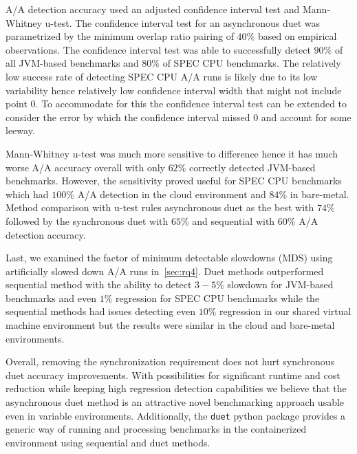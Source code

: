 A/A detection accuracy used an adjusted confidence interval test and \mbox{Mann-Whitney} \mbox{u-test}.
The confidence interval test for an asynchronous duet was parametrized by the minimum overlap ratio pairing of $40\%$ based on empirical observations.
The confidence interval test was able to successfully detect $90\%$ of all \mbox{JVM-based} benchmarks and $80\%$ of SPEC CPU benchmarks.
The relatively low success rate of detecting SPEC CPU A/A runs is likely due to its low variability hence relatively low confidence interval width that might not include point $0$.
To accommodate for this the confidence interval test can be extended to consider the error by which the confidence interval missed $0$ and account for some leeway.

\mbox{Mann-Whitney} \mbox{u-test} was much more sensitive to difference hence it has much worse A/A accuracy overall with only $62\%$ correctly detected \mbox{JVM-based} benchmarks.
However, the sensitivity proved useful for SPEC CPU benchmarks which had $100\%$ A/A detection in the cloud environment and $84\%$ in \mbox{bare-metal}.
Method comparison with \mbox{u-test} rules asynchronous duet as the best with $74\%$ followed by the synchronous duet with $65\%$ and sequential with $60\%$ A/A detection accuracy.

Last, we examined the factor of minimum detectable slowdowns (MDS) using artificially slowed down A/A runs in~\cref{sec:rq4}.
Duet methods outperformed sequential method with the ability to detect $3-5\%$ slowdown for \mbox{JVM-based} benchmarks and even $1\%$ regression for SPEC CPU benchmarks while the sequential methods had issues detecting even $10\%$ regression in our shared virtual machine environment but the results were similar in the cloud and bare-metal environments.

Overall, removing the synchronization requirement does not hurt synchronous duet accuracy improvements.
With possibilities for significant runtime and cost reduction while keeping high regression detection capabilities we believe that the asynchronous duet method is an attractive novel benchmarking approach usable even in variable environments.
Additionally, the \lstinline{duet} python package provides a generic way of running and processing benchmarks in the containerized environment using sequential and duet methods.

